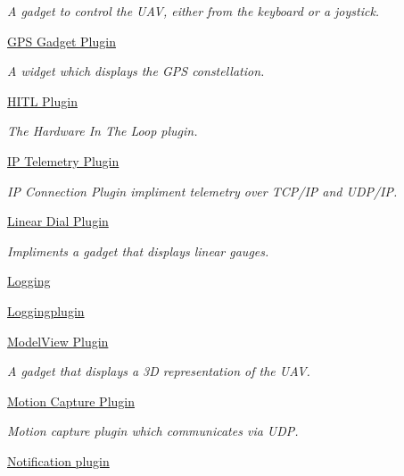 \begin{DoxyCompactItemize}
\begin{DoxyCompactList}\small\item\em \-A gadget to control the \-U\-A\-V, either from the keyboard or a joystick. \end{DoxyCompactList}\item 
\hyperlink{group___g_p_s_gadget_plugin}{\-G\-P\-S Gadget Plugin}
\begin{DoxyCompactList}\small\item\em \-A widget which displays the \-G\-P\-S constellation. \end{DoxyCompactList}\item 
\hyperlink{group___h_i_t_l_plugin}{\-H\-I\-T\-L Plugin}
\begin{DoxyCompactList}\small\item\em \-The \-Hardware \-In \-The \-Loop plugin. \end{DoxyCompactList}\item 
\hyperlink{group___i_p_conn_plugin}{\-I\-P Telemetry Plugin}
\begin{DoxyCompactList}\small\item\em \-I\-P \-Connection \-Plugin impliment telemetry over \-T\-C\-P/\-I\-P and \-U\-D\-P/\-I\-P. \end{DoxyCompactList}\item 
\hyperlink{group___linear_dial_plugin}{\-Linear Dial Plugin}
\begin{DoxyCompactList}\small\item\em \-Impliments a gadget that displays linear gauges. \end{DoxyCompactList}\item 
\hyperlink{group___logging}{\-Logging}
\item 
\hyperlink{group__loggingplugin}{\-Loggingplugin}
\item 
\hyperlink{group___model_view_plugin}{\-Model\-View Plugin}
\begin{DoxyCompactList}\small\item\em \-A gadget that displays a 3\-D representation of the \-U\-A\-V. \end{DoxyCompactList}\item 
\hyperlink{group___mo_cap_plugin}{\-Motion Capture Plugin}
\begin{DoxyCompactList}\small\item\em \-Motion capture plugin which communicates via \-U\-D\-P. \end{DoxyCompactList}\item 
\hyperlink{group___notify_plugin}{\-Notification plugin}

\end{DoxyCompactItemize}
